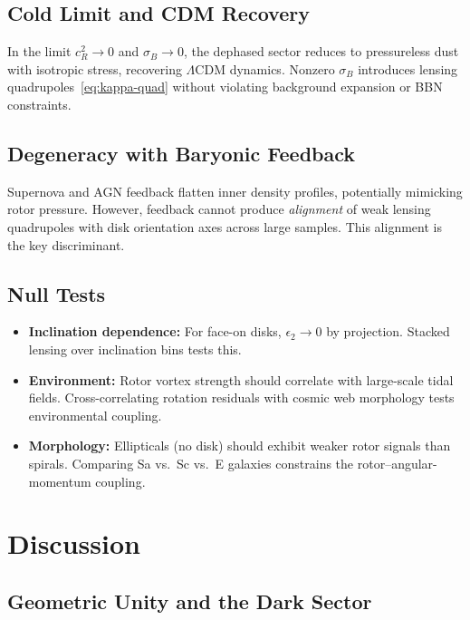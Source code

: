 \documentclass[11pt,a4paper]{article}
\numberwithin{equation}{section}
\theoremstyle{plain}
\theoremstyle{definition}
\theoremstyle{remark}
\begin{document}
\subsection{Cold Limit and CDM Recovery}

In the limit $c_R^2\to 0$ and $\sigma_B\to 0$, the dephased sector reduces to pressureless dust with isotropic stress, recovering $\Lambda$CDM dynamics. Nonzero $\sigma_B$ introduces lensing quadrupoles~\eqref{eq:kappa-quad} without violating background expansion or BBN constraints.

\subsection{Degeneracy with Baryonic Feedback}

Supernova and AGN feedback flatten inner density profiles, potentially mimicking rotor pressure. However, feedback cannot produce \emph{alignment} of weak lensing quadrupoles with disk orientation axes across large samples. This alignment is the key discriminant.

\subsection{Null Tests}

\begin{itemize}[leftmargin=*]
  \item \textbf{Inclination dependence:} For face-on disks, $\epsilon_2\to 0$ by projection. Stacked lensing over inclination bins tests this.
  \item \textbf{Environment:} Rotor vortex strength should correlate with large-scale tidal fields. Cross-correlating rotation residuals with cosmic web morphology tests environmental coupling.
  \item \textbf{Morphology:} Ellipticals (no disk) should exhibit weaker rotor signals than spirals. Comparing Sa vs.\ Sc vs.\ E galaxies constrains the rotor--angular-momentum coupling.
\end{itemize}

\vspace{1em}

\section{Discussion}\label{sec:discussion}

\subsection{Geometric Unity and the Dark Sector}
\end{document}
